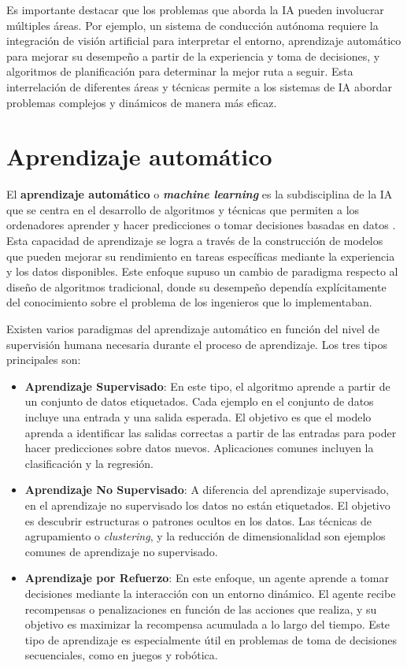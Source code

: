 Es importante destacar que los problemas que aborda la IA pueden involucrar múltiples áreas. Por ejemplo, un sistema de conducción autónoma requiere la integración de visión artificial para interpretar el entorno, aprendizaje automático para mejorar su desempeño a partir de la experiencia y toma de decisiones, y algoritmos de planificación para determinar la mejor ruta a seguir. Esta interrelación de diferentes áreas y técnicas permite a los sistemas de IA abordar problemas complejos y dinámicos de manera más eficaz.

\section{Aprendizaje automático}

El \textbf{aprendizaje automático}  o \textbf{\textit{machine learning}} es la subdisciplina de la IA que se centra en el desarrollo de algoritmos y técnicas que permiten a los ordenadores aprender y hacer predicciones o tomar decisiones basadas en datos \cite{hastie2009elements}. Esta capacidad de aprendizaje se logra a través de la construcción de modelos que pueden mejorar su rendimiento en tareas específicas mediante la experiencia y los datos disponibles. Este enfoque supuso un cambio de paradigma respecto al diseño de algoritmos tradicional, donde su desempeño dependía explícitamente del conocimiento sobre el problema de los ingenieros que lo implementaban.

Existen varios paradigmas del aprendizaje automático en función del nivel de supervisión humana necesaria durante el proceso de aprendizaje. Los tres tipos principales son:

\begin{itemize}
	\item \textbf{Aprendizaje Supervisado}: En este tipo, el algoritmo aprende a partir de un conjunto de datos etiquetados. Cada ejemplo en el conjunto de datos incluye una entrada y una salida esperada. El objetivo es que el modelo aprenda a identificar las salidas correctas a partir de las entradas para poder hacer predicciones sobre datos nuevos. Aplicaciones comunes incluyen la clasificación y la regresión.
	
	\item \textbf{Aprendizaje No Supervisado}: A diferencia del aprendizaje supervisado, en el aprendizaje no supervisado los datos no están etiquetados. El objetivo es descubrir estructuras o patrones ocultos en los datos. Las técnicas de agrupamiento o \textit{clustering}, y la reducción de dimensionalidad son ejemplos comunes de aprendizaje no supervisado.
	
	\item \textbf{Aprendizaje por Refuerzo}: En este enfoque, un agente aprende a tomar decisiones mediante la interacción con un entorno dinámico. El agente recibe recompensas o penalizaciones en función de las acciones que realiza, y su objetivo es maximizar la recompensa acumulada a lo largo del tiempo. Este tipo de aprendizaje es especialmente útil en problemas de toma de decisiones secuenciales, como en juegos y robótica.
\end{itemize}

